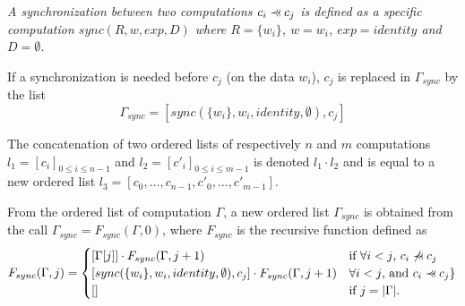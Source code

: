 \begin{mydef}
\textit{A synchronization between two computations $c_i \pprec c_j$ is defined as a specific computation $sync(R,w,exp,D)$ where $R=\{w_i\}$, $w=w_i$, $exp=identity$ and $D=\emptyset$.}
\end{mydef}

\begin{mydef}
If a synchronization is needed before $c_j$ (on the data $w_i$), $c_j$ is replaced in $\Gamma_{sync}$ by the list
\begin{equation*}
\Gamma_{sync} = [sync(\{w_i\},w_i,identity,\emptyset), c_j]
\end{equation*}
\end{mydef}

\begin{mydef}
The concatenation of two ordered lists of respectively $n$ and $m$ computations $l_1=[c_i]_{0 \leq i \leq n-1}$ and $l_2=[c'_i]_{0 \leq i \leq m-1}$ is denoted $l_1 \cdot l_2$ and is equal to a new ordered list $l_3=[c_0,\dots,c_{n-1},c'_0,\dots,c'_{m-1}]$.
\end{mydef}

\begin{mydef}
From the ordered list of computation $\Gamma$, a new ordered list $\Gamma_{sync}$ is obtained from the call $\Gamma_{sync} = F_{sync}(\Gamma,0)$, where $F_{sync}$ is the recursive function defined as
\begin{equation*}
F_{sync}(\Gamma,j) = 
\begin{cases} 	[\Gamma[j]] \cdot F_{sync}(\Gamma,j+1) & \mbox{if }\forall i<j \mbox{, } c_i \not\pprec c_j\\
				[sync(\{w_i\},w_i,identity,\emptyset), c_j] \cdot F_{sync}(\Gamma,j+1) & \forall i<j \text{, and }c_i \pprec c_j\}\\
				[] & \mbox{if }j=|\Gamma|.
\end{cases}
\end{equation*}
\end{mydef}


